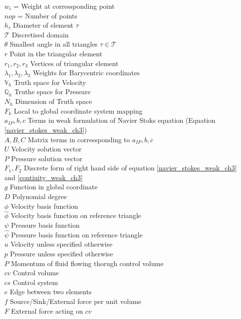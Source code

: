 \documentclass[a4paper,12pt]{book}
\begin{document}
$w_i$ = Weight at corressponding point\\
$nop$ = Number of points\\
$h_\tau$ Diameter of element $\tau$\\
$\mathcal{T}$ Discretised domain\\
$\theta$ Smallest angle in all triangles $\tau \in \mathcal{T}$\\
$r$ Point in the triangular element\\
$r_1,r_2,r_3$ Vertices of triangular element\\
$\lambda_1, \lambda_2, \lambda_3$ Weights for Barycentric coordinates\\
$\mathbb{V}_h$ Truth space for Velocity\\
$\mathbb{Q}_h$ Truthe space for Pressure\\
$N_h$ Dimension of Truth space\\
$F_k$ Local to global coordinate system mapping\\
$a_{IP}, b, c$ Terms in weak formulation of Navier Stoks equation (Equation \eqref{navier_stokes_weak_ch3}) \\
$A,B,C$ Matrix terms in corressponding to $a_{IP}, b, c$\\
$U$ Velocity solution vector \\
$P$ Pressure solution vector\\
$F_1,F_2$ Discrete form of right hand side of equation \eqref{navier_stokes_weak_ch3} and \eqref{contiuity_weak_ch3}\\
$g$ Function in global coordinate\\
$D$ Polynomial degree \\
$\phi$ Velocity basis function\\
$\hat{\phi}$ Velocity basis function on reference triangle\\
$\psi$ Pressure basis function\\
$\hat{\psi}$ Pressure basis function on reference triangle\\
$u$ Velocity unless specified otherwise\\
$p$ Pressure unless specified otherwise\\
$P$ Momentum of fluid flowing thorugh control volume\\
$cv$ Control volume\\
$cs$ Control system\\
$e$ Edge between two elements\\ 
$f$ Source/Sink/External force per unit volume\\
$F$ External force acting on $cv$\\
\end{document}
